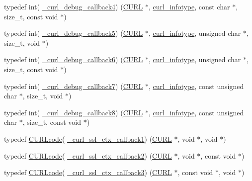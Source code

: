 \begin{DoxyCompactItemize}
\item 
typedef int( \hyperlink{typecheck-gcc_8h_a8577cd6fbe76c09f0e0242d94f842651}{\+\_\+curl\+\_\+debug\+\_\+callback4}) (\hyperlink{curl_8h_ace655e3633b6533591283994d6b5cdda}{C\+U\+R\+L} $\ast$, \hyperlink{curl_8h_a9704d2633927f77efaa3e3c6f1c23a14}{curl\+\_\+infotype}, const char $\ast$, size\+\_\+t, const void $\ast$)
\item 
typedef int( \hyperlink{typecheck-gcc_8h_a413cefc946d02050fd8ed446fb16d4af}{\+\_\+curl\+\_\+debug\+\_\+callback5}) (\hyperlink{curl_8h_ace655e3633b6533591283994d6b5cdda}{C\+U\+R\+L} $\ast$, \hyperlink{curl_8h_a9704d2633927f77efaa3e3c6f1c23a14}{curl\+\_\+infotype}, unsigned char $\ast$, size\+\_\+t, void $\ast$)
\item 
typedef int( \hyperlink{typecheck-gcc_8h_a125129a4ee026e1ba2ea8bffc369e894}{\+\_\+curl\+\_\+debug\+\_\+callback6}) (\hyperlink{curl_8h_ace655e3633b6533591283994d6b5cdda}{C\+U\+R\+L} $\ast$, \hyperlink{curl_8h_a9704d2633927f77efaa3e3c6f1c23a14}{curl\+\_\+infotype}, unsigned char $\ast$, size\+\_\+t, const void $\ast$)
\item 
typedef int( \hyperlink{typecheck-gcc_8h_ae964409993dea78229a06595a232b8c6}{\+\_\+curl\+\_\+debug\+\_\+callback7}) (\hyperlink{curl_8h_ace655e3633b6533591283994d6b5cdda}{C\+U\+R\+L} $\ast$, \hyperlink{curl_8h_a9704d2633927f77efaa3e3c6f1c23a14}{curl\+\_\+infotype}, const unsigned char $\ast$, size\+\_\+t, void $\ast$)
\item 
typedef int( \hyperlink{typecheck-gcc_8h_a5c3caa775cdc5419a7934129fe16eae8}{\+\_\+curl\+\_\+debug\+\_\+callback8}) (\hyperlink{curl_8h_ace655e3633b6533591283994d6b5cdda}{C\+U\+R\+L} $\ast$, \hyperlink{curl_8h_a9704d2633927f77efaa3e3c6f1c23a14}{curl\+\_\+infotype}, const unsigned char $\ast$, size\+\_\+t, const void $\ast$)
\item 
typedef \hyperlink{curl_8h_af0691941698240652e0a391394217951}{C\+U\+R\+Lcode}( \hyperlink{typecheck-gcc_8h_a05c55b1e4b35247bffa0fbe08d41ad38}{\+\_\+curl\+\_\+ssl\+\_\+ctx\+\_\+callback1}) (\hyperlink{curl_8h_ace655e3633b6533591283994d6b5cdda}{C\+U\+R\+L} $\ast$, void $\ast$, void $\ast$)
\item 
typedef \hyperlink{curl_8h_af0691941698240652e0a391394217951}{C\+U\+R\+Lcode}( \hyperlink{typecheck-gcc_8h_adc0ea99771e27458c834d1d6f8bdcc22}{\+\_\+curl\+\_\+ssl\+\_\+ctx\+\_\+callback2}) (\hyperlink{curl_8h_ace655e3633b6533591283994d6b5cdda}{C\+U\+R\+L} $\ast$, void $\ast$, const void $\ast$)
\item 
typedef \hyperlink{curl_8h_af0691941698240652e0a391394217951}{C\+U\+R\+Lcode}( \hyperlink{typecheck-gcc_8h_aa175d06eb00c16e50b97f65abe59d620}{\+\_\+curl\+\_\+ssl\+\_\+ctx\+\_\+callback3}) (\hyperlink{curl_8h_ace655e3633b6533591283994d6b5cdda}{C\+U\+R\+L} $\ast$, const void $\ast$, void $\ast$)

\end{DoxyCompactItemize}
